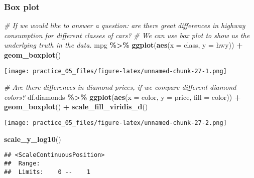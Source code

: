 \documentclass[
]{article}
\newenvironment{Shaded}{\begin{snugshade}}{\end{snugshade}}
\newcommand{\AttributeTok}[1]{\textcolor[rgb]{0.13,0.29,0.53}{#1}}
\newcommand{\CommentTok}[1]{\textcolor[rgb]{0.56,0.35,0.01}{\textit{#1}}}
\newcommand{\FunctionTok}[1]{\textcolor[rgb]{0.13,0.29,0.53}{\textbf{#1}}}
\newcommand{\NormalTok}[1]{#1}
\newcommand{\SpecialCharTok}[1]{\textcolor[rgb]{0.81,0.36,0.00}{\textbf{#1}}}
\begin{document}
\subsubsection{Box plot}\label{box-plot}

\begin{Shaded}
\begin{Highlighting}[]
\CommentTok{\# If we would like to answer a question: are there great differences in highway consumption for different classes of cars?}
\CommentTok{\# We can use box plot to show us the underlying truth in the data.}
\NormalTok{mpg }\SpecialCharTok{\%\textgreater{}\%} 
  \FunctionTok{ggplot}\NormalTok{(}\FunctionTok{aes}\NormalTok{(}\AttributeTok{x =}\NormalTok{ class,}
             \AttributeTok{y =}\NormalTok{ hwy)) }\SpecialCharTok{+}
  \FunctionTok{geom\_boxplot}\NormalTok{()}
\end{Highlighting}
\end{Shaded}

\texttt{[image: practice\_05\_files/figure-latex/unnamed-chunk-27-1.png]}

\begin{Shaded}
\begin{Highlighting}[]
\CommentTok{\# Are there differences in diamond prices, if we compare different diamond colors?}
\NormalTok{df.diamonds }\SpecialCharTok{\%\textgreater{}\%} 
  \FunctionTok{ggplot}\NormalTok{(}\FunctionTok{aes}\NormalTok{(}\AttributeTok{x =}\NormalTok{ color,}
             \AttributeTok{y =}\NormalTok{ price,}
             \AttributeTok{fill =}\NormalTok{ color)) }\SpecialCharTok{+}
  \FunctionTok{geom\_boxplot}\NormalTok{() }\SpecialCharTok{+}
  \FunctionTok{scale\_fill\_viridis\_d}\NormalTok{()}
\end{Highlighting}
\end{Shaded}

\texttt{[image: practice\_05\_files/figure-latex/unnamed-chunk-27-2.png]}

\begin{Shaded}
\begin{Highlighting}[]
  \FunctionTok{scale\_y\_log10}\NormalTok{()}
\end{Highlighting}
\end{Shaded}

\begin{verbatim}
## <ScaleContinuousPosition>
##  Range:  
##  Limits:    0 --    1
\end{verbatim}
\end{document}

